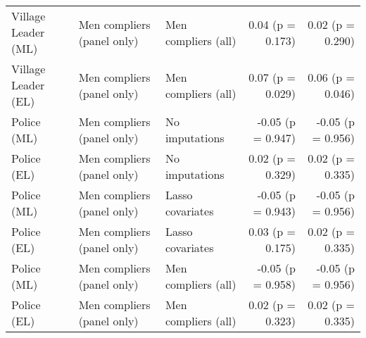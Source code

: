 \begin{tabular}{lllrr}
   Village Leader (ML) & Men compliers (panel only) & Men compliers (all) & 0.04 (p = 0.173) & 0.02 (p = 0.290) \\ 
   Village Leader (EL) & Men compliers (panel only) & Men compliers (all) & 0.07 (p = 0.029) & 0.06 (p = 0.046) \\ 
   Police (ML) & Men compliers (panel only) & No imputations & -0.05 (p = 0.947) & -0.05 (p = 0.956) \\ 
   Police (EL) & Men compliers (panel only) & No imputations & 0.02 (p = 0.329) & 0.02 (p = 0.335) \\ 
   Police (ML) & Men compliers (panel only) & Lasso covariates & -0.05 (p = 0.943) & -0.05 (p = 0.956) \\ 
   Police (EL) & Men compliers (panel only) & Lasso covariates & 0.03 (p = 0.175) & 0.02 (p = 0.335) \\ 
   Police (ML) & Men compliers (panel only) & Men compliers (all) & -0.05 (p = 0.958) & -0.05 (p = 0.956) \\ 
   Police (EL) & Men compliers (panel only) & Men compliers (all) & 0.02 (p = 0.323) & 0.02 (p = 0.335) \\ 
   \hline
\end{tabular}
